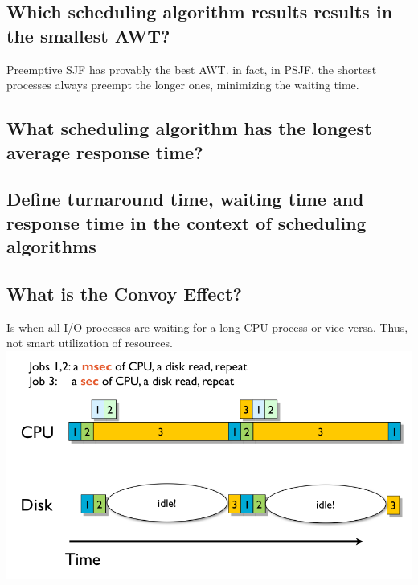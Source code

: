 \documentclass[a4paper]{article}
\begin{document}
\subsection{Which scheduling algorithm results results in the smallest AWT?} %
\label{sub:Which scheduling algorithm results results in the smallest AWT?}
Preemptive SJF has provably the best AWT. in fact, in PSJF, the shortest processes always preempt the longer ones, minimizing
the waiting time.
\subsection{What scheduling algorithm has the longest average response time?} %
\label{sub:What scheduling algorithm has the longest average response time?}

\subsection{Define turnaround time, waiting time and response time in the context of scheduling algorithms} %
\label{sub:Define turnaround time, waiting time and response time in the context of scheduling algorithms}

\subsection{What is the Convoy Effect?} %
\label{sub:What is the Convoy Effect?}
Is when all I/O processes are waiting for a long CPU process or vice versa. Thus, not smart utilization of resources. \\
\includegraphics[scale=.45]{convoy.png}
\end{document}
